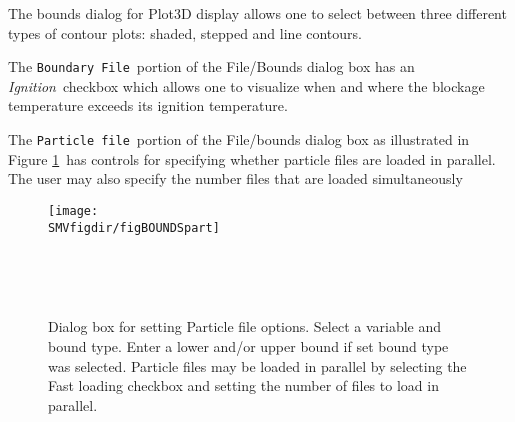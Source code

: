 \documentclass[11pt,twoside]{book}
\begin{document}
The bounds dialog for Plot3D display allows one to select between
three different types of contour plots:  shaded, stepped and line
contours.

The {\tt Boundary File}\ portion of the File/Bounds dialog
box has an {\em Ignition}\ checkbox which allows one to visualize
when and where the blockage temperature exceeds its ignition
temperature.

The {\tt Particle file}\ portion of the File/bounds dialog box
as illustrated in Figure \ref{figBOUNDSpart}\
has controls for specifying whether particle files are loaded in parallel.
The user may also specify the number files that are loaded simultaneously

\begin{figure}[bph]
\centerline{
\texttt{[image: \\SMVfigdir/figBOUNDSpart]}
}\ \caption[Dialog box for setting Particle file
options.] {Dialog box for setting Particle file
options. Select a variable and bound type. Enter a lower
and/or upper bound if set bound type was selected. Particle files may be loaded in parallel by
selecting the Fast loading checkbox and setting the number of files to load in parallel.
 }\ \label{figBOUNDSpart}
\end{figure}
\end{document}

